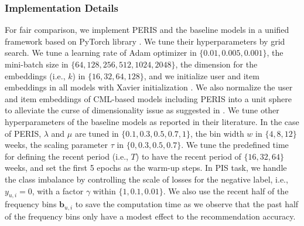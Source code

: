 \documentclass[sigconf]{acmart}
\newcommand{\MD}{{\small\textsf{PERIS}}}
\begin{document}
\subsubsection{\textbf{Implementation Details}}
For fair comparison, we implement \MD{} and the baseline models in a unified framework based on PyTorch library \cite{paszke2019pytorch}. We tune their hyperparameters by grid search. We tune a learning rate of Adam optimizer \cite{kingma2014adam} in $\{0.01, 0.005, 0.001\}$, the mini-batch size in $\{64, 128, 256, 512, 1024, 2048\}$, the dimension for the embeddings (i.e., $k$) in $\{16, 32, 64, 128\}$, and we initialize user and item embeddings in all models with Xavier initialization \cite{glorot2010understanding}. We also normalize the user and item embeddings of CML-based models including \MD{} into a unit sphere to alleviate the curse of dimensionality issue as suggested in \cite{bordes2013translating,hsieh2017collaborative}. We tune other hyperparameters of the baseline models as reported in their literature. 
In the case of \MD{}, $\lambda$ and $\mu$ are tuned in $\{0.1, 0.3, 0.5, 0.7, 1\}$, the bin width $w$ in $\{4, 8, 12\}$ weeks, the scaling parameter $\tau$ in $\{0, 0.3, 0.5, 0.7\}$. We tune the predefined time for defining the recent period (i.e., $T$) to have the recent period of $\{16, 32, 64\}$ weeks, and set the first 5 epochs as the warm-up steps. 
In PIS task, we handle the class imbalance by controlling the scale of losses for the negative label, i.e., $y_{u,i}=0$, with a factor $\gamma$ within $\{1, 0.1, 0.01\}$.
We also use the recent half of the frequency bins $\textbf{b}_{u,i}$ to save the computation time as we observe that the past half of the frequency bins only have a modest effect to the recommendation accuracy.
\end{document}
